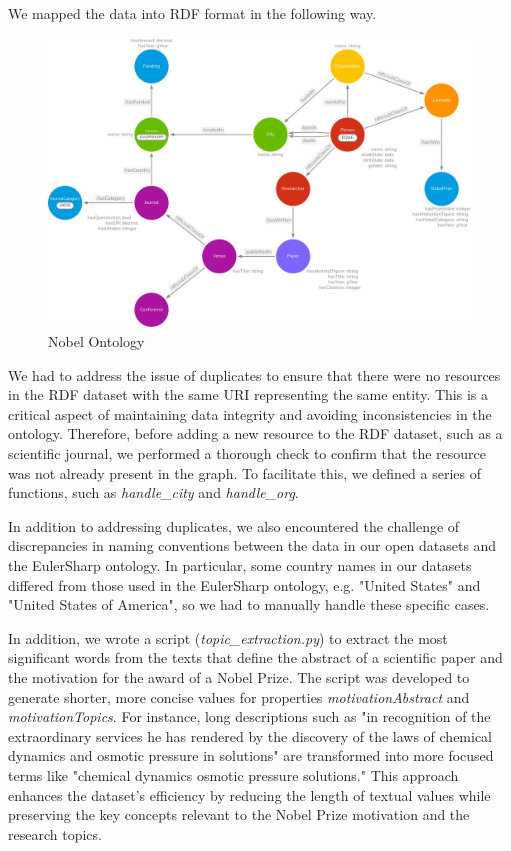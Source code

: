 \documentclass{article}
\begin{document}
\noindent We mapped the data into RDF format in the following way.

\begin{figure}[ht]
	\centering
	\includegraphics[width=\textwidth]{../nobelOntologyTransparent.png}
	\caption{Nobel Ontology}
	\label{fig:nobelOntology}
\end{figure}

\newpage

\noindent We had to address the issue of duplicates to ensure that there were no resources in the RDF dataset with the same URI representing the same
entity. This is a critical aspect of maintaining data integrity and avoiding inconsistencies in the ontology. Therefore, before adding a new resource to
the RDF dataset, such as a scientific journal, we performed a thorough check to confirm that the resource was not already present in the graph.
To facilitate this, we defined a series of functions, such as \textit{handle\_city} and \textit{handle\_org}.

\noindent In addition to addressing duplicates, we also encountered the challenge of discrepancies in naming conventions between the data in our open
datasets and the EulerSharp ontology. In particular, some country names in our datasets differed from those used in the EulerSharp ontology, e.g. "United
States" and "United States of America", so we had to manually handle these specific cases.

\noindent In addition, we wrote a script (\textit{topic\_extraction.py}) to extract the most significant words from the texts that define the abstract of a
scientific paper and the motivation for the award of a Nobel Prize. The script was developed to generate shorter, more concise values for properties
\textit{motivationAbstract} and \textit{motivationTopics}. For instance, long descriptions such as "in recognition of the extraordinary services he has rendered by the
discovery of the laws of chemical dynamics and osmotic pressure in solutions" are transformed into more focused terms like "chemical dynamics osmotic
pressure solutions." This approach enhances the dataset's efficiency by reducing the length of textual values while preserving the key concepts relevant
to the Nobel Prize motivation and the research topics.
\end{document}
